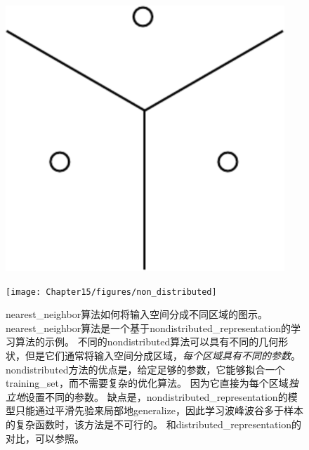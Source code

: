 

\begin{figure}[!htb]
\ifOpenSource
\centerline{\includegraphics[scale=0.5]{images/135.png}}
\else
\centerline{\texttt{[image: Chapter15/figures/non\_distributed]}}
\fi
\caption{\gls{nearest_neighbor}算法如何将输入空间分成不同区域的图示。
\gls{nearest_neighbor}算法是一个基于\gls{nondistributed_representation}的学习算法的示例。
不同的\gls{nondistributed}算法可以具有不同的几何形状，但是它们通常将输入空间分成区域，\emph{每个区域具有不同的参数}。
\gls{nondistributed}方法的优点是，给定足够的参数，它能够拟合一个\gls{training_set}，而不需要复杂的优化算法。
因为它直接为每个区域\emph{独立地}设置不同的参数。
缺点是，\gls{nondistributed_representation}的模型只能通过平滑先验来局部地\gls{generalize}，因此学习波峰波谷多于样本的复杂函数时，该方法是不可行的。
和\gls{distributed_representation}的对比，可以参照。
}
\label{fig:chap15_nondistributed}
\end{figure}




